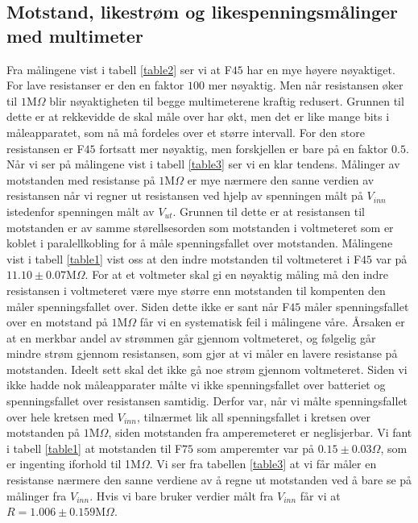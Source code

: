 \documentclass[%
 reprint,
 amsmath,amssymb,
 aps,
]{revtex4-1}
\begin{document}
\subsection{Motstand, likestrøm og likespenningsmålinger med multimeter}
Fra målingene vist i tabell \ref{table2} ser vi at F$45$ har en mye høyere nøyaktiget. For lave resistanser er den en faktor $100$ mer nøyaktig. Men når resistansen øker til $1$M$\Omega$ blir nøyaktigheten til begge multimeterene kraftig redusert. Grunnen til dette er at rekkevidde de skal måle over har økt, men det er like mange bits i måleapparatet, som nå må fordeles over et større intervall. For den store resistansen er F$45$ fortsatt mer nøyaktig, men forskjellen er bare på en faktor $0.5$.
\\
Når vi ser på målingene vist i tabell \ref{table3} ser vi en klar tendens. Målinger av motstanden med resistanse på $1$M$\Omega$ er mye nærmere den sanne verdien av resistansen når vi regner ut resistansen ved hjelp av spenningen målt på $V_{inn}$ istedenfor spenningen målt av  $V_{ut}$.
Grunnen til dette er at resistansen til motstanden er av samme størellsesorden som motstanden i voltmeteret som er koblet i paralellkobling for å måle spenningsfallet over motstanden. Målingene vist i tabell \ref{table1} vist oss at den indre motstanden til voltmeteret i F$45$ var på $11.10\pm0.07$M$\Omega$. For at et voltmeter skal gi en nøyaktig måling må den indre resistansen i voltmeteret være mye større enn motstanden til kompenten den måler spenningsfallet over. Siden dette ikke er sant når F$45$ måler spenningsfallet over en motstand på $1$M$\Omega$ får vi en systematisk feil i målingene våre. Årsaken er at en merkbar andel av strømmen går gjennom voltmeteret, og følgelig går mindre strøm gjennom resistansen, som gjør at vi måler en lavere resistanse på motstanden. Ideelt sett skal det ikke gå noe strøm gjennom voltmeteret.
Siden vi ikke hadde nok måleapparater målte vi ikke spenningsfallet over batteriet og spenningsfallet over resistansen samtidig. Derfor var, når vi målte spenningsfallet over hele kretsen med $V_{inn}$, tilnærmet lik all spenningsfallet i kretsen over motstanden på $1$M$\Omega$, siden motstanden fra amperemeteret er neglisjerbar. Vi fant i tabell \ref{table1} at motstanden til F$75$ som amperemter var på $0.15 \pm 0.03\Omega$, som er ingenting iforhold til 1M$\Omega$.
Vi ser fra tabellen \ref{table3} at vi får måler en resistanse nærmere den sanne verdiene av å regne ut motstanden ved å bare se på målinger fra $V_{inn}$. Hvis vi bare bruker verdier målt fra $V_{inn}$ får vi at $R = 1.006 \pm 0.159$M$\Omega$.
\end{document}
